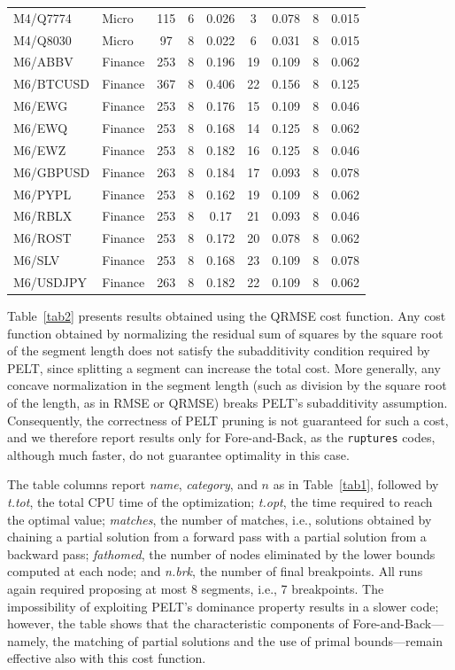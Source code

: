 \documentclass[runningheads]{llncs}
\begin{document}
\begin{table}
\begin{tabular}{llc|cc|cc|cc}
		M4/Q7774  &    Micro & 115 & 6 & 0.026 &  3 & 0.078 & 8 & 0.015\\ 
		M4/Q8030  &    Micro &  97 & 8 & 0.022 &  6 & 0.031 & 8 & 0.015\\ 
		M6/ABBV   &  Finance & 253 & 8 & 0.196 & 19 & 0.109 & 8 & 0.062\\ 
		M6/BTCUSD &  Finance & 367 & 8 & 0.406 & 22 & 0.156 & 8 & 0.125\\
		M6/EWG    &  Finance & 253 & 8 & 0.176 & 15 & 0.109 & 8 & 0.046\\ 
		M6/EWQ    &  Finance & 253 & 8 & 0.168 & 14 & 0.125 & 8 & 0.062\\ 
		M6/EWZ    &  Finance & 253 & 8 & 0.182 & 16 & 0.125 & 8 & 0.046\\ 
		M6/GBPUSD &  Finance & 263 & 8 & 0.184 & 17 & 0.093 & 8 & 0.078\\ 
		M6/PYPL   &  Finance & 253 & 8 & 0.162 & 19 & 0.109 & 8 & 0.062\\ 
		M6/RBLX   &  Finance & 253 & 8 & 0.17  & 21 & 0.093 & 8 & 0.046\\ 
		M6/ROST   &  Finance & 253 & 8 & 0.172 & 20 & 0.078 & 8 & 0.062\\ 
		M6/SLV    &  Finance & 253 & 8 & 0.168 & 23 & 0.109 & 8 & 0.078\\ 
		M6/USDJPY &  Finance & 263 & 8 & 0.182 & 22 & 0.109 & 8 & 0.062\\ 
		\hline
	\end{tabular}
\end{table}

Table~\ref{tab2} presents results obtained using the QRMSE cost function. Any cost function obtained by normalizing the residual sum of squares by the square root of the segment length does not satisfy the subadditivity condition required by PELT, since splitting a segment can increase the total cost. More generally, any concave normalization in the segment length (such as division by the square root of the length, as in RMSE or QRMSE) breaks PELT’s subadditivity assumption. Consequently, the correctness of PELT pruning is not guaranteed for such a cost, and we therefore report results only for Fore-and-Back, as the \texttt{ruptures} codes, although much faster, do not guarantee optimality in this case.

The table columns report {\it name}, {\it category}, and $n$ as in Table~\ref{tab1}, followed by {\it t.tot}, the total CPU time of the optimization; {\it t.opt}, the time required to reach the optimal value; {\it matches}, the number of matches, i.e., solutions obtained by chaining a partial solution from a forward pass with a partial solution from a backward pass; {\it fathomed}, the number of nodes eliminated by the lower bounds computed at each node; and {\it n.brk}, the number of final breakpoints. All runs again required proposing at most 8 segments, i.e., 7 breakpoints. The impossibility of exploiting PELT’s dominance property results in a slower code; however, the table shows that the characteristic components of Fore-and-Back—namely, the matching of partial solutions and the use of primal bounds—remain effective also with this cost function.
\end{document}

